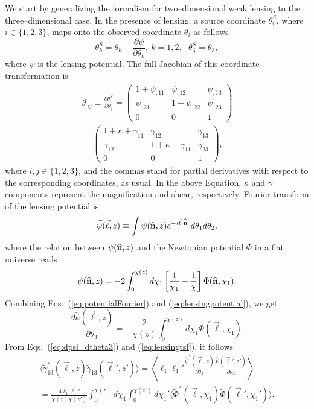 \documentclass[aps,prd,twocolumn,floatfix,showpacs,superscriptaddress,nofootinbib]{revtex4-1}
\newcommand{\beq}{\begin{equation}}
\newcommand{\eeq}{\end{equation}}
\newcommand{\bga}{\begin{gathered}}
\newcommand{\ega}{\end{gathered}}
\begin{document}
We start by generalizing the formalism for two--dimensional weak lensing \cite{Weinberg201387} to the three--dimensional case.
In the presence of lensing, a source coordinate $\theta_i^S$, where $i\in\{1,2,3\}$, maps onto the observed coordinate $\theta_i$ as follows 
\beq
\theta_k^S=\theta_k+\frac{\partial\psi}{\partial\theta_k},\ k=1,2,\ \ \ \theta_3^S=\theta_3,
\label{eq:lensingmapping}
\eeq
where $\psi$ is the lensing potential. The full Jacobian of this coordinate transformation is
\beq
\bga
\mathcal{J}_{ij}\equiv\frac{\partial\theta_i^S}{\partial\theta_j}=\left(\begin{array}{ccc}
1+\psi_{,11} & \psi_{,12} & \psi_{,13}\\
\psi_{,21} & 1+\psi_{,22} & \psi_{,23}\\
0&0&1
\end{array}\right) \\
= \left(\begin{array}{ccc}
1+\kappa+\gamma_{11} & \gamma_{12} & \gamma_{13}\\
\gamma_{12} & 1+\kappa-\gamma_{11} & \gamma_{23}\\
0&0&1
\end{array}\right),
\ega
\label{eq:lensingtsf}
\eeq
where $i,j\in\{1,2,3\}$, and the commas stand for partial derivatives with respect to the corresponding coordinates, as usual. In the above Equation, $\kappa$ and $\gamma$ components represent the magnification and shear, respectively. Fourier transform of the lensing potential is
\begin{equation}
\widetilde{\psi}(\vec{\ell},z)\equiv\int\psi({\bf\widehat{n}},z)e^{-i\vec{\ell}\cdot{\bf{\widehat n}}}\ d\theta_1 d\theta_2,
\label{eq:potentialFourier}
\end{equation}
where the relation between $\psi({\bf\widehat{n}},z)$ and the Newtonian potential $\Phi$ in a flat universe reads
\begin{equation}
\psi({\bf{\widehat n}},z)=
-2\int_0^{\chi(z)}d\chi_1\left[\frac{1}{\chi_1}-\frac{1}{\chi}\right]\Phi({\bf{\widehat n}},\chi_1).
\label{eq:lensingpotential}
\end{equation}
Combining Eqs.~(\ref{eq:potentialFourier}) and (\ref{eq:lensingpotential}), we get 
\begin{equation}
\frac{\partial\widetilde{\psi}(\vec{\ell},z)}{\partial\theta_3}=-\frac{2}{\chi(z)}\int_0^{\chi(z)} d\chi_1\widetilde{\Phi}(\vec{\ell},\chi_1).
\label{eq:dpsi_dtheta3}
\end{equation}
From Eqs.~(\ref{eq:dpsi_dtheta3}) and (\ref{eq:lensingtsf}), it follows 
\beq
\bga
\langle\widetilde{\gamma}_{13}^*(\vec{\ell},z)\widetilde{\gamma}_{13}(\vec{\ell}',z')\rangle=\left\langle \ell_1\ell_1'\frac{\widetilde{\psi}^*(\vec{\ell},z)}{\partial\theta_3}\frac{\widetilde{\psi}(\vec{\ell}',z')}{\partial\theta_3}\right\rangle\\
=\frac{4\ell_1\ell_1'}{\chi(z)\chi(z')}\int_0^{\chi(z)}d\chi_1\int_0^{\chi(z')}d\chi_1'\langle\widetilde{\Phi}^*(\vec{\ell},\chi_1)\widetilde{\Phi}(\vec{\ell}',\chi_1')\rangle.
\ega
\eeq
\end{document}
